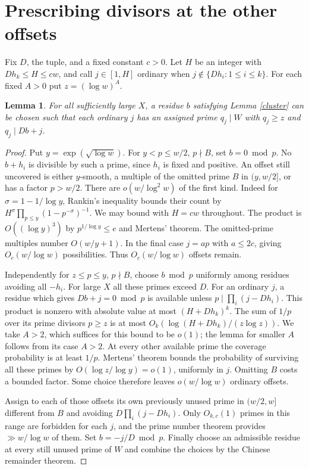 \documentclass[10pt]{article}
\newtheorem{lemma}[theorem]{Lemma}
\begin{document}
\section{Prescribing divisors at the other offsets}
Fix $D$, the tuple, and a fixed constant $c>0$. Let $H$ be an integer with $D h_k\le H\le c w$, and call $j\in[1,H]$ ordinary when $j\notin\{Dh_i:1\le i\le k\}$. For each fixed $A>0$ put $z=(\log w)^A$.

\begin{lemma}\label{guard}
For all sufficiently large $X$, a residue $b$ satisfying Lemma \ref{cluster} can be chosen such that each ordinary $j$ has an assigned prime $q_j\mid W$ with $q_j\ge z$ and $q_j\mid Db+j$.
\end{lemma}
\begin{proof}
Put $y=\exp(\sqrt{\log w})$. For $y<p\le w/2$, $p\nmid B$, set $b=0\bmod p$. No $b+h_i$ is divisible by such a prime, since $h_i$ is fixed and positive. An offset still uncovered is either $y$-smooth, a multiple of the omitted prime $B$ in $(y,w/2]$, or has a factor $p>w/2$. There are $o(w/\log^2 w)$ of the first kind. Indeed for $\sigma=1-1/\log y$, Rankin's inequality bounds their count by $H^\sigma\prod_{p\le y}(1-p^{-\sigma})^{-1}$. We may bound with $H=cw$ throughout. The product is $O((\log y)^3)$ by $p^{1/\log y}\le e$ and Mertens' theorem. The omitted-prime multiples number $O(w/y+1)$. In the final case $j=ap$ with $a\le2c$, giving $O_c(w/\log w)$ possibilities. Thus $O_c(w/\log w)$ offsets remain.

Independently for $z\le p\le y$, $p\nmid B$, choose $b\bmod p$ uniformly among residues avoiding all $-h_i$. For large $X$ all these primes exceed $D$. For an ordinary $j$, a residue which gives $Db+j=0\bmod p$ is available unless $p\mid\prod_i(j-Dh_i)$. This product is nonzero with absolute value at most $(H+Dh_k)^k$. The sum of $1/p$ over its prime divisors $p\ge z$ is at most $O_k(\log(H+Dh_k)/(z\log z))$. We take $A>2$, which suffices for this bound to be $o(1)$; the lemma for smaller $A$ follows from its case $A>2$. At every other available prime the coverage probability is at least $1/p$. Mertens' theorem bounds the probability of surviving all these primes by $O(\log z/\log y)=o(1)$, uniformly in $j$. Omitting $B$ costs a bounded factor. Some choice therefore leaves $o(w/\log w)$ ordinary offsets.

Assign to each of those offsets its own previously unused prime in $(w/2,w]$ different from $B$ and avoiding $D\prod_i(j-Dh_i)$. Only $O_{k,c}(1)$ primes in this range are forbidden for each $j$, and the prime number theorem provides $\gg w/\log w$ of them. Set $b=-j/D\bmod p$. Finally choose an admissible residue at every still unused prime of $W$ and combine the choices by the Chinese remainder theorem.
\end{proof}
\end{document}
